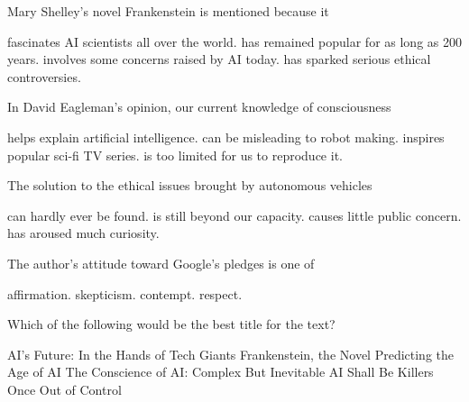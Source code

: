 \item Mary Shelley's novel Frankenstein is mentioned because it
\begin{tasks}
	\task fascinates AI scientists all over the world.
	\task has remained popular for as long as 200 years.
	\task involves some concerns raised by AI today.
	\task has sparked serious ethical controversies.
\end{tasks}
\item In David Eagleman's opinion, our current knowledge of consciousness
\begin{tasks}
	\task helps explain artificial intelligence.
	\task can be misleading to robot making.
	\task inspires popular sci-fi TV series.
	\task is too limited for us to reproduce it.
\end{tasks}
\item The solution to the ethical issues brought by autonomous vehicles
\begin{tasks}
	\task can hardly ever be found.
	\task is still beyond our capacity.
	\task causes little public concern.
	\task has aroused much curiosity.
\end{tasks}
\item The author's attitude toward Google's pledges is one of
\begin{tasks}
	\task affirmation.
	\task skepticism.
	\task contempt.
	\task respect.
\end{tasks}
\item Which of the following would be the best title for the text?
\begin{tasks}
	\task AI's Future: In the Hands of Tech Giants
	\task Frankenstein, the Novel Predicting the Age of AI
	\task The Conscience of AI: Complex But Inevitable
	\task AI Shall Be Killers Once Out of Control
\end{tasks}
